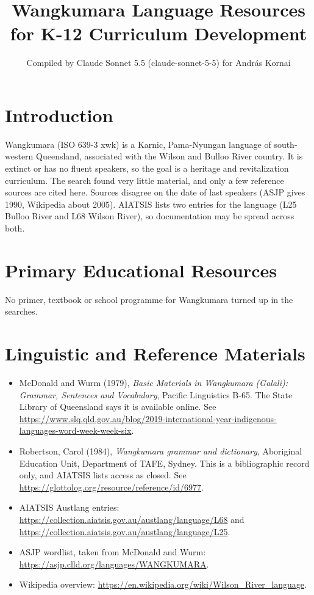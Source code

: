 \documentclass[12pt]{article}
\title{Wangkumara Language Resources for K-12 Curriculum Development}
\author{Compiled by Claude Sonnet 5.5 (claude-sonnet-5-5) for Andr\'as Kornai}
\date{}
\begin{document}
\maketitle

\section{Introduction}
Wangkumara (ISO 639-3 xwk) is a Karnic, Pama-Nyungan language of south-western Queensland, associated with the Wilson and Bulloo River country. It is extinct or has no fluent speakers, so the goal is a heritage and revitalization curriculum. The search found very little material, and only a few reference sources are cited here. Sources disagree on the date of last speakers (ASJP gives 1990, Wikipedia about 2005). AIATSIS lists two entries for the language (L25 Bulloo River and L68 Wilson River), so documentation may be spread across both.

\section{Primary Educational Resources}
No primer, textbook or school programme for Wangkumara turned up in the searches.

\section{Linguistic and Reference Materials}
\begin{itemize}
\item McDonald and Wurm (1979), \emph{Basic Materials in Wangkumara (Galali): Grammar, Sentences and Vocabulary}, Pacific Linguistics B-65. The State Library of Queensland says it is available online. See \url{https://www.slq.qld.gov.au/blog/2019-international-year-indigenous-languages-word-week-week-six}.
\item Robertson, Carol (1984), \emph{Wangkumara grammar and dictionary}, Aboriginal Education Unit, Department of TAFE, Sydney. This is a bibliographic record only, and AIATSIS lists access as closed. See \url{https://glottolog.org/resource/reference/id/6977}.
\item AIATSIS Austlang entries: \url{https://collection.aiatsis.gov.au/austlang/language/L68} and \url{https://collection.aiatsis.gov.au/austlang/language/L25}.
\item ASJP wordlist, taken from McDonald and Wurm: \url{https://asjp.clld.org/languages/WANGKUMARA}.
\item Wikipedia overview: \url{https://en.wikipedia.org/wiki/Wilson_River_language}.
\end{itemize}
\end{document}
